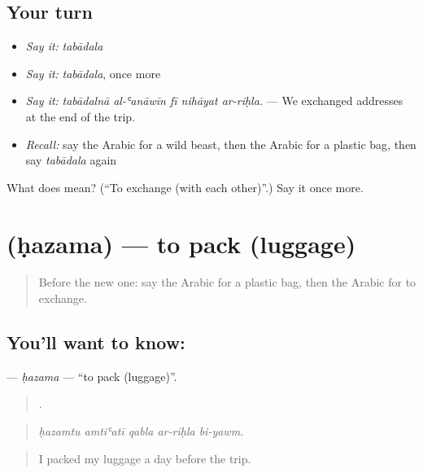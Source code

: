 \subsection*{Your turn}
\begin{itemize}
\raggedright
  \item \emph{Say it:} \emph{tabādala}
  \item \emph{Say it:} \emph{tabādala}, once more
  \item \emph{Say it:} \emph{tabādalnā al-ʿanāwīn fī nihāyat ar-riḥla.} — We exchanged addresses at the end of the trip.
  \item \emph{Recall:} say the Arabic for a wild beast, then the Arabic for a plastic bag, then say \emph{tabādala} again
\end{itemize}

\begin{tcolorbox}[breakable,colback=teal!4,colframe=teal!35!black,title={Before you move on}]
What does  mean? (\textquotedblleft{}To exchange (with each other)\textquotedblright{}.) Say it once more.
\end{tcolorbox}
\section[\texorpdfstring{\ar{حزم} (ḥazama)}{حزم (ḥazama)}]{ (ḥazama) — to pack (luggage)}

\label{lesson:AR-C479-hazama}



\begin{quote}
Before the new one: say the Arabic for a plastic bag, then the Arabic for to exchange.
\end{quote}

\subsection*{You'll want to know: }
\textbf{} — \emph{ḥazama} — \textquotedblleft{}to pack (luggage)\textquotedblright{}.

\begin{quote}
    .
\end{quote}

\begin{quote}
\emph{ḥazamtu amtiʿatī qabla ar-riḥla bi-yawm.}
\end{quote}

\begin{quote}
I packed my luggage a day before the trip.
\end{quote}

